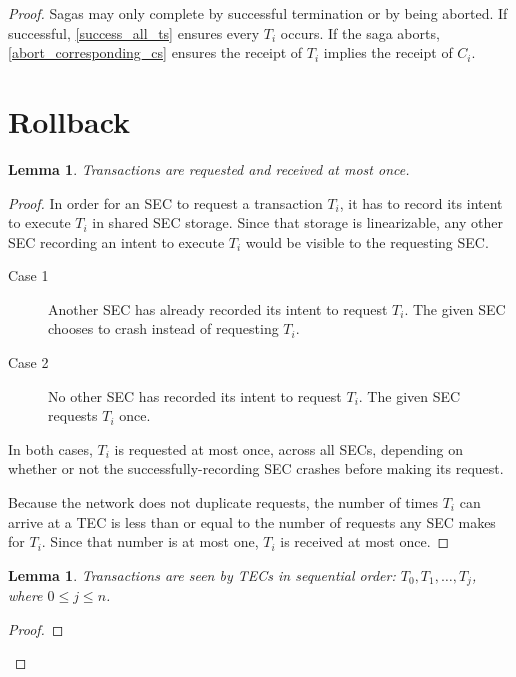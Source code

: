 \documentclass{article}
\newtheorem{lemma}[theorem]{Lemma}
\begin{document}
\begin{proof}

Sagas may only complete by successful termination or by being aborted. If
successful, \ref{success_all_ts} ensures every $T_i$ occurs. If the saga
aborts, \ref{abort_corresponding_cs} ensures the receipt of $T_i$ implies the
receipt of $C_i$.


\section{Rollback}

\begin{lemma}
\label{t_at_most_once}
Transactions are requested and received at most once.
\end{lemma}

\begin{proof}

In order for an SEC to request a transaction $T_i$, it has to record its intent
to execute $T_i$ in shared SEC storage. Since that storage is linearizable, any
other SEC recording an intent to execute $T_i$ would be visible to the
requesting SEC.

\begin{description}
  \item[Case 1] Another SEC has already recorded its intent to request $T_i$.
The given SEC chooses to crash instead of requesting $T_i$.
  \item[Case 2] No other SEC has recorded its intent to request $T_i$. The
given SEC requests $T_i$ once.
\end{description}

In both cases, $T_i$ is requested at most once, across all SECs, depending on
whether or not the successfully-recording SEC crashes before making its
request.

Because the network does not duplicate requests, the number of times $T_i$ can
arrive at a TEC is less than or equal to the number of requests any SEC makes
for $T_i$. Since that number is at most one, $T_i$ is received at most once.

\end{proof}


\begin{lemma}
\label{t_sequential}
Transactions are seen by TECs in sequential order: $T_0, T_1, \ldots, T_j$,
where $0 \le j \le n$.
\end{lemma}

\begin{proof}


\end{proof}
\end{proof}
\end{document}

